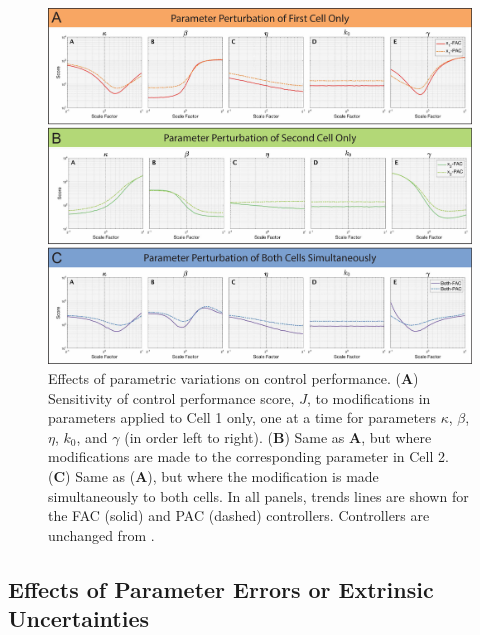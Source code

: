 \documentclass[12pt]{article}
\begin{document}
\begin{figure}
\begin{center}
\includegraphics[width=1\textwidth]{ParameterPerturbation.pdf}
\caption{Effects of parametric variations on control performance.  ({\bf A}) Sensitivity of control performance score, $J$, to modifications in parameters applied to Cell 1 only, one at a time for parameters $\kappa$, $\beta$, $\eta$, $k_0$, and $\gamma$ (in order left to right).  ({\bf B}) Same as {\bf A}, but where modifications are made to the corresponding parameter in Cell 2. ({\bf C}) Same as ({\bf A}), but where the modification is made simultaneously to both cells. In all panels, trends lines are shown for the FAC (solid) and PAC (dashed) controllers. Controllers are unchanged from \cite{May2021}.}
\label{Parameter}
\end{center}
\end{figure}

\subsection{Effects of Parameter Errors or Extrinsic Uncertainties}
\end{document}
